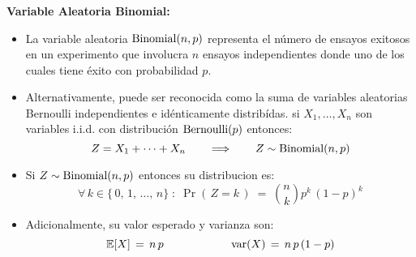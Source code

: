 \documentclass[ 10pt, xcolor = dvipsnames]{beamer}
\begin{document}
\begin{frame}[allowframebreaks]
\frametitle{\insertsection}

\textbf{Variable Aleatoria Binomial:}
\begin{itemize}
\item La variable aleatoria $\text{Binomial}(n,p)$ representa el n\'umero de ensayos exitosos en un experimento que involucra $n$ ensayos independientes donde uno de los cuales tiene \'exito con probabilidad $p$. 
\item Alternativamente, puede ser reconocida como la suma de variables aleatorias Bernoulli independientes e id\'enticamente distrib\'idas. \Ie si $X_1, \dots, X_n$ son variables i.i.d. con distribuci\'on $\text{Bernoulli}(p)$ entonces: 
\[
Z = X_1 + \cdots + X_n \qquad \Longrightarrow \qquad
Z \sim \text{Binomial}(n,p)
\]
\framebreak
\item Si $Z \sim \text{Binomial}(n,p)$ entonces su distribucion es: 
\[
\forall \, k \in \{ \, 0, \, 1, \, \dots, \, n \} \; \colon \;
\Pr( \, Z = k \, ) \; = \; {n \choose k} p^k \, (1-p)^k
\]
\item Adicionalmente, su valor esperado y varianza son: 
\[
\mathbb{E}[X] \, = \, n \, p \qquad \qquad \qquad
\text{var}(X) \, = \, n \, p \, (1-p)
\]
\end{itemize}

\end{frame}
\end{document}
